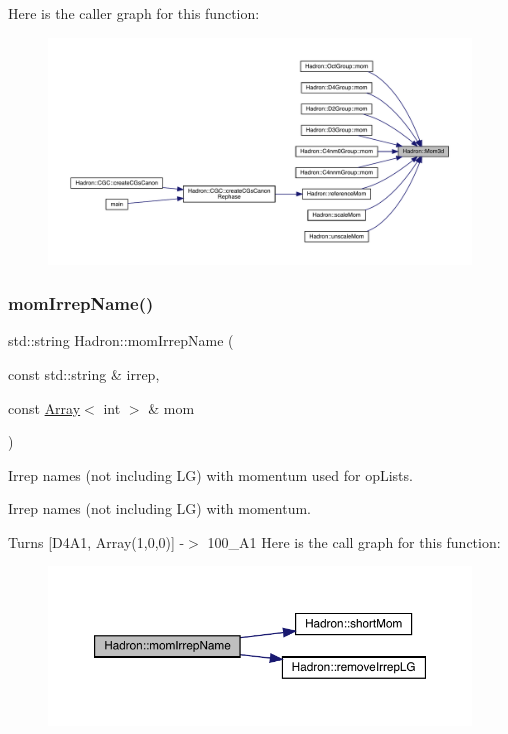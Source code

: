 Here is the caller graph for this function\+:\nopagebreak
\begin{figure}[H]
\begin{center}
\leavevmode
\includegraphics[width=350pt]{d1/daf/namespaceHadron_af72905f43cac8c79d2479565a6fe54d3_icgraph}
\end{center}
\end{figure}
\mbox{\label{namespaceHadron_a5c4cac841f1c5a1f144e6c98360d8a4d}} 
\subsubsection{\texorpdfstring{momIrrepName()}{momIrrepName()}}
{\footnotesize\ttfamily std\+::string Hadron\+::mom\+Irrep\+Name (\begin{DoxyParamCaption}\item[{const std\+::string \&}]{irrep,  }\item[{const \mbox{\hyperlink{classXMLArray_1_1Array}{Array}}$<$ int $>$ \&}]{mom }\end{DoxyParamCaption})}



Irrep names (not including LG) with momentum used for op\+Lists. 

Irrep names (not including LG) with momentum.

Turns \mbox{[}D4\+A1, Array(1,0,0)\mbox{]} -\/$>$ 100\+\_\+\+A1 Here is the call graph for this function\+:\nopagebreak
\begin{figure}[H]
\begin{center}
\leavevmode
\includegraphics[width=350pt]{d1/daf/namespaceHadron_a5c4cac841f1c5a1f144e6c98360d8a4d_cgraph}
\end{center}
\end{figure}
\mbox{\label{namespaceHadron_ad1ac646aa2d410cc55e4b11c925867a6}} 
